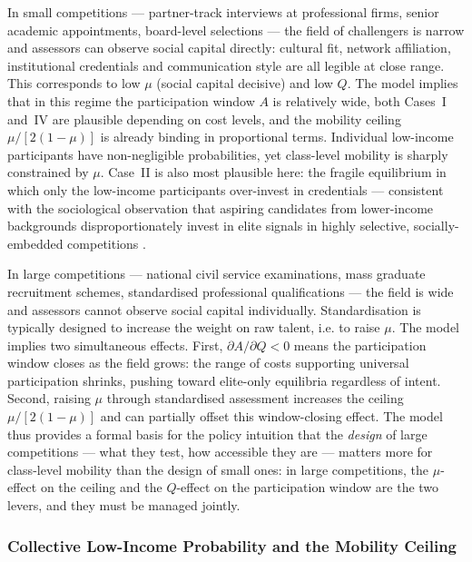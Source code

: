 \documentclass[
    oneside,
    fontsize=10pt,leqno]{article}
\begin{document}
In small competitions --- partner-track interviews at professional
firms, senior academic appointments, board-level selections --- the
field of challengers is narrow and assessors can observe social
capital directly: cultural fit, network affiliation, institutional
credentials and communication style are all legible at close range.
This corresponds to low $\mu$ (social capital decisive) and low $Q$.
The model implies that in this regime the participation window $A$ is
relatively wide, both Cases~I and~IV are plausible depending on cost
levels, and the mobility ceiling $\mu/[2(1-\mu)]$ is already binding
in proportional terms. Individual low-income participants have non-negligible
probabilities, yet class-level mobility is sharply constrained by $\mu$.
Case~II is also most plausible here: the fragile equilibrium in which
only the low-income participants over-invest in credentials --- consistent with the
sociological observation that aspiring candidates from lower-income
backgrounds disproportionately invest in elite signals in highly
selective, socially-embedded competitions
\citep{HeckmanMosso2014,MijsParadox2019}.

In large competitions --- national civil service examinations, mass
graduate recruitment schemes, standardised professional qualifications
--- the field is wide and assessors cannot observe social capital
individually. Standardisation is typically designed to increase the
weight on raw talent, i.e. to raise $\mu$. The model implies two
simultaneous effects. First, $\partial A/\partial Q<0$ means the
participation window closes as the field grows: the range of costs
supporting universal participation shrinks, pushing toward elite-only
equilibria regardless of intent. Second, raising $\mu$ through
standardised assessment increases the ceiling $\mu/[2(1-\mu)]$ and
can partially offset this window-closing effect. The model thus
provides a formal basis for the policy intuition that the \emph{design}
of large competitions --- what they test, how accessible they are ---
matters more for class-level mobility than the design of small ones:
in large competitions, the $\mu$-effect on the ceiling and the
$Q$-effect on the participation window are the two levers, and they
must be managed jointly.

\subsubsection{\label{subsec:Mobility-Ceiling}Collective Low-Income Probability
and the Mobility Ceiling}
\end{document}
